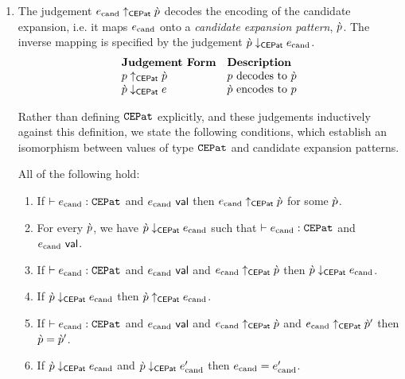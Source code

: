 {{{{\begin{enumerate}
If the parse function produces a value labeled $\lbltxt{ParseError}$, then typed expansion fails. No rule is necessary to handle this case. 

\item The judgement $e_\text{cand} \uparrow_\mathsf{CEPat} \grave{p}$ decodes the encoding of the candidate expansion, i.e. it maps $e_\text{cand}$ onto a \emph{candidate expansion pattern}, $\grave{p}$. The inverse mapping is specified by the judgement $\grave{p} \downarrow_\mathsf{CEPat} e_\text{cand}$. %
\[\begin{array}{ll}
\textbf{Judgement Form} & \textbf{Description}\\
p \uparrow_\mathsf{CEPat} \grave{p} & \text{$p$ decodes to $\grave{p}$}\\
\grave{p} \downarrow_\mathsf{CEPat} e & \text{$\grave{p}$ encodes to $p$}
\end{array}\]

Rather than defining $\mathtt{CEPat}$ explicitly, and these judgements inductively against this definition, we state the following conditions, which establish an isomorphism between values of type $\mathtt{CEPat}$ and candidate expansion patterns.
\begin{condition} All of the following hold:
\begin{enumerate}
\item If $\vdash e_\text{cand} : \mathtt{CEPat}$ and $e_\text{cand}~\mathsf{val}$ then $e_\text{cand} \uparrow_\mathsf{CEPat} \grave{p}$ for some $\grave{p}$.
\item For every $\grave{p}$, we have $\grave{p} \downarrow_\mathsf{CEPat} e_\text{cand}$ such that $\vdash e_\text{cand} : \mathtt{CEPat}$ and $e_\text{cand}~\mathsf{val}$.
\item If $\vdash e_\text{cand} : \mathtt{CEPat}$ and $e_\text{cand}~\mathsf{val}$ and $e_\text{cand} \uparrow_\mathsf{CEPat} \grave{p}$ then $\grave{p} \downarrow_\mathsf{CEPat} e_\text{cand}$.
\item If $\grave{p} \downarrow_\mathsf{CEPat} e_\text{cand}$ then $\grave{p} \uparrow_\mathsf{CEPat} e_\text{cand}$.
\item If $\vdash e_\text{cand} : \mathtt{CEPat}$ and $e_\text{cand}~\mathsf{val}$ and $e_\text{cand} \uparrow_\mathsf{CEPat} \grave{p}$ and $e_\text{cand} \uparrow_\mathsf{CEPat} \grave{p}'$ then $\grave{p}=\grave{p}'$.
\item If $\grave{p} \downarrow_\mathsf{CEPat} e_\text{cand}$ and $\grave{p} \downarrow_\mathsf{CEPat} e_\text{cand}'$ then $e_\text{cand}=e_\text{cand}'$.
\end{enumerate}
\end{condition}


\end{enumerate}}}}}
